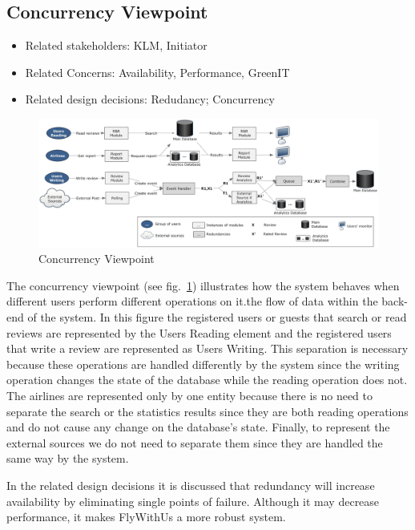 % 

\subsection{Concurrency Viewpoint}

\begin{itemize}
\item Related stakeholders: KLM, Initiator
\item Related Concerns: Availability, Performance, GreenIT
\item Related design decisions: Redudancy; Concurrency
\end{itemize}

\newpage
\begin{landscape}
\begin{figure}
\includegraphics[width=600px]{ConcurrencyViewpoint.jpg}
\caption{Concurrency Viewpoint}
\label{fig:concurrency}
\end{figure}
\end{landscape}

The concurrency viewpoint (see fig.~\ref{fig:concurrency}) illustrates how the system behaves when different users perform different operations on it.the flow of data within the back-end of the system. In this figure the registered users or guests that search or read reviews are represented by the Users Reading element and the registered users that write a  review are represented as Users Writing. This separation is necessary because these operations are handled differently by the system since the writing operation changes the state of the database while the reading operation does not. The airlines are represented only by one entity because there is no need to separate the search or the statistics results since they are both reading operations and do not cause any change on the database's state. Finally, to represent the external sources we do not need to separate them since they are handled the same way by the system.

In the related design decisions it is discussed that redundancy will increase availability by eliminating single points of failure. Although it may decrease performance, it makes FlyWithUs a more robust system. 

